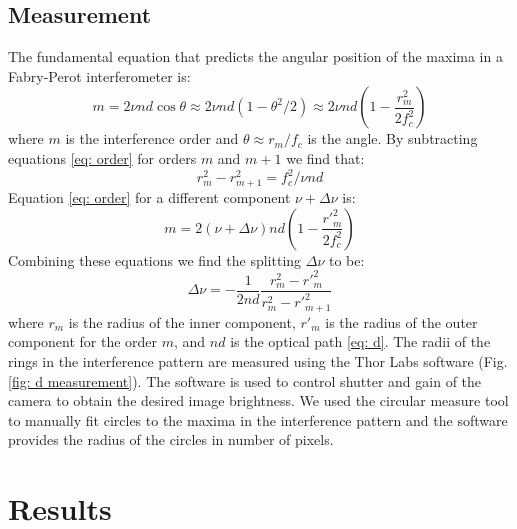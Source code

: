 \documentclass[11pt]{article}
\begin{document}
\subsection{Measurement} \label{sec: measuremet}
The fundamental equation that predicts the angular position of the maxima in a Fabry-Perot interferometer is:
\begin{equation}
    m = 2 \nu n d \cos{\theta} 
    \approx 2 \nu n d (1 - \theta^2/2)
    \approx 2 \nu n d (1 - \frac{r^2_m}{2f^2_c})
    \label{eq: order}
\end{equation}
where $m$ is the interference order and $\theta  \approx r_m/f_c$ is the angle. By subtracting equations \eqref{eq: order} for orders $m$ and $m + 1$ we find that: 
\begin{equation}
    r^2_m - r^2_{m+1} = f^2_c/\nu n d
\end{equation}
Equation \eqref{eq: order} for a different component $\nu + \Delta \nu$ is: 
\begin{equation}
    m = 2 (\nu + \Delta \nu) n d (1 - \frac{r'^2_m}{2f^2_c})
\end{equation}
Combining these equations we find the splitting $\Delta \nu$ to be: 
\begin{equation}
    \Delta \nu = - \frac{1}{2nd} \frac{r^2_m - r'^2_m}{r^2_m - r'^2_{m+1}}
    \label{eq: nu measurement}
\end{equation}
where $r_m$ is the radius of the inner component, $r'_m$ is the radius of the outer component for the order $m$, and $nd$ is the optical path \eqref{eq: d}. The radii of the rings in the interference pattern are measured using the Thor Labs software (Fig. \ref{fig: d measurement}). The software is used to control shutter and gain of the camera to obtain the desired image brightness. We used the circular measure tool to manually fit circles to the maxima in the interference pattern and the software provides the radius of the circles in number of pixels. 




\section{Results} \label{sec: results}
\end{document}
